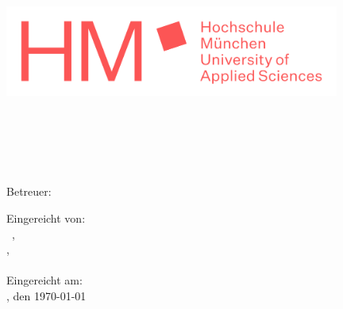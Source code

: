 \begin{titlepage}
    \pagestyle{empty}
    
    \begin{center}	
    
    \includegraphics[height=3cm]{content/pictures/hm.png}
    
    \vspace{1cm}

    \docFakultaet\\
    \docStudiengang\\

    \vspace{3cm}
    {\huge \docArtDerArbeit}\\

    \vspace{2cm}
    {\Huge \docTitle}\\
    \vspace{0.5cm}
    {\selectfont \docUntertitle}

    \vspace{2cm}
    Betreuer: \docErsterReferent\\

    \end{center}

    \vspace{2cm}
    \begin{flushright}
    Eingereicht von: \\
    \docVorname~\docNachname, \docMatrikelnummer\\
    \docStrasse,~\docPlz~\docOrt\\
    \docEmail\\


    \vspace{0.5cm}
    Eingereicht am:\\
    \docOrt, den \today
    \end{flushright}

    \end{titlepage}